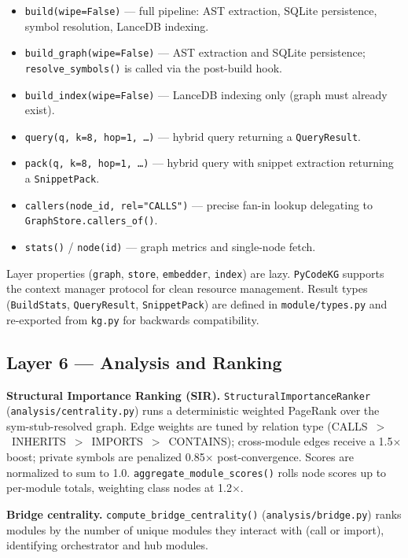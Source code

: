 \documentclass[10pt]{article}
\begin{document}
\begin{itemize}
\item \texttt{build(wipe=False)} --- full pipeline: AST extraction, SQLite
persistence, symbol resolution, LanceDB indexing.
\item \texttt{build\_graph(wipe=False)} --- AST extraction and SQLite persistence;
\texttt{resolve\_symbols()} is called via the post-build hook.
\item \texttt{build\_index(wipe=False)} --- LanceDB indexing only (graph must
already exist).
\item \texttt{query(q, k=8, hop=1, \ldots)} --- hybrid query returning a
\texttt{QueryResult}.
\item \texttt{pack(q, k=8, hop=1, \ldots)} --- hybrid query with snippet extraction
returning a \texttt{SnippetPack}.
\item \texttt{callers(node\_id, rel="CALLS")} --- precise fan-in lookup delegating
to \texttt{GraphStore.callers\_of()}.
\item \texttt{stats()} / \texttt{node(id)} --- graph metrics and single-node fetch.
\end{itemize}

Layer properties (\texttt{graph}, \texttt{store}, \texttt{embedder}, \texttt{index})
are lazy. \texttt{PyCodeKG} supports the context manager protocol for clean resource
management.  Result types (\texttt{BuildStats}, \texttt{QueryResult},
\texttt{SnippetPack}) are defined in \texttt{module/types.py} and re-exported
from \texttt{kg.py} for backwards compatibility.

\subsection{Layer 6 --- Analysis and Ranking}

\textbf{Structural Importance Ranking (SIR).}
\texttt{StructuralImportanceRanker} (\texttt{analysis/centrality.py}) runs a
deterministic weighted PageRank over the sym-stub-resolved graph.  Edge weights
are tuned by relation type (CALLS~$>$~INHERITS~$>$~IMPORTS~$>$~CONTAINS); cross-module
edges receive a 1.5$\times$ boost; private symbols are penalized 0.85$\times$
post-convergence.  Scores are normalized to sum to 1.0.
\texttt{aggregate\_module\_scores()} rolls node scores up to per-module totals,
weighting class nodes at 1.2$\times$.

\textbf{Bridge centrality.}
\texttt{compute\_bridge\_centrality()} (\texttt{analysis/bridge.py}) ranks modules
by the number of unique modules they interact with (call or import), identifying
orchestrator and hub modules.
\end{document}
